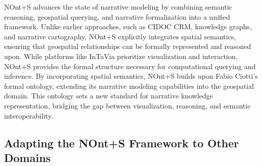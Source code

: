 NOnt+S advances the state of narrative modeling by combining semantic reasoning, geospatial querying, and narrative formalization into a unified framework. Unlike earlier approaches, such as CIDOC CRM, knowledge graphs, and narrative cartography, NOnt+S explicitly integrates spatial semantics, ensuring that geospatial relationships can be formally represented and reasoned upon. While platforms like InTaVia prioritize visualization and interaction, NOnt+S provides the formal structure necessary for computational querying and inference. By incorporating spatial semantics, NOnt+S builds upon Fabio Ciotti's formal ontology, extending its narrative modeling capabilities into the geospatial domain. This ontology sets a new standard for narrative knowledge representation, bridging the gap between visualization, reasoning, and semantic interoperability.

\subsection{Adapting the NOnt+S Framework to Other Domains}

